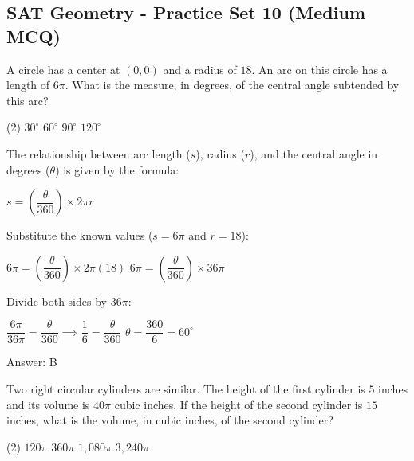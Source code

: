 \documentclass[11pt,paper=a4,answers]{exam}
\begin{document}
\begin{questions}
\section*{SAT Geometry - Practice Set 10 (Medium MCQ)}

\question
A circle has a center at $(0,0)$ and a radius of $18$. An arc on this circle has a length of $6\pi$. What is the measure, in degrees, of the central angle subtended by this arc?
\begin{tasks}(2)
    \task $30^\circ$
    \task $60^\circ$
    \task $90^\circ$
    \task $120^\circ$
\end{tasks}

\begin{solution}
The relationship between arc length ($s$), radius ($r$), and the central angle in degrees ($\theta$) is given by the formula:
\vspace{5pt}
\begin{center}
$s = \left( \dfrac{\theta}{360} \right) \times 2\pi r$
\end{center}
\vspace{5pt}
Substitute the known values ($s = 6\pi$ and $r = 18$):
\vspace{5pt}
\begin{center}
$6\pi = \left( \dfrac{\theta}{360} \right) \times 2\pi(18)$
\vspace{5pt}
$6\pi = \left( \dfrac{\theta}{360} \right) \times 36\pi$
\end{center}
\vspace{5pt}
Divide both sides by $36\pi$:
\vspace{5pt}
\begin{center}
$\dfrac{6\pi}{36\pi} = \dfrac{\theta}{360} \implies \dfrac{1}{6} = \dfrac{\theta}{360}$
\vspace{5pt}
$\theta = \dfrac{360}{6} = 60^\circ$
\end{center}
\vspace{5pt}
Answer: \colorbox{yellow!100}{B}
\end{solution}

\vspace{1cm}

\question
Two right circular cylinders are similar. The height of the first cylinder is $5$ inches and its volume is $40\pi$ cubic inches. If the height of the second cylinder is $15$ inches, what is the volume, in cubic inches, of the second cylinder?
\begin{tasks}(2)
    \task $120\pi$
    \task $360\pi$
    \task $1,080\pi$
    \task $3,240\pi$
\end{tasks}


\end{questions}
\end{document}
